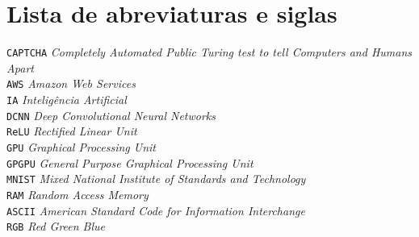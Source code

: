 
\chapter*{Lista de abreviaturas e siglas}

\noindent
\verb"CAPTCHA" \dotfill \textit{Completely Automated Public Turing
  test to tell Computers and Humans Apart}\\
\verb"AWS" \dotfill \textit{Amazon Web Services}\\
\verb"IA" \dotfill \textit{Inteligência Artificial}\\
\verb"DCNN" \dotfill \textit{Deep Convolutional Neural Networks}\\
\verb"ReLU" \dotfill \textit{Rectified Linear Unit}\\
\verb"GPU" \dotfill \textit{Graphical Processing Unit}\\
\verb"GPGPU" \dotfill \textit{General Purpose Graphical Processing
  Unit}\\
\verb"MNIST" \dotfill \textit{Mixed National Institute of Standards
  and Technology}\\
\verb"RAM" \dotfill \textit{Random Access Memory}\\
\verb"ASCII" \dotfill \textit{American Standard Code for Information
  Interchange}\\
\verb"RGB" \dotfill \textit{Red Green Blue}\\